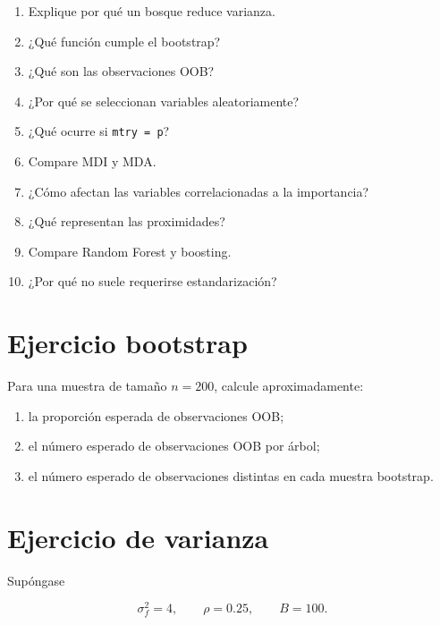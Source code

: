 \documentclass[
  spanish,
  10.5pt,
  letterpaper,
  DIV=11,
  numbers=noendperiod,
  oneside,
  open=any]{scrreprt}
\providecommand{\tightlist}{%
  \setlength{\itemsep}{0pt}\setlength{\parskip}{0pt}}
\theoremstyle{definition}
\theoremstyle{definition}
\theoremstyle{plain}
\theoremstyle{remark}
\begin{document}

\begin{enumerate}
\def\labelenumi{\arabic{enumi}.}
\tightlist
\item
  Explique por qué un bosque reduce varianza.
\item
  ¿Qué función cumple el bootstrap?
\item
  ¿Qué son las observaciones OOB?
\item
  ¿Por qué se seleccionan variables aleatoriamente?
\item
  ¿Qué ocurre si \texttt{mtry\ =\ p}?
\item
  Compare MDI y MDA.
\item
  ¿Cómo afectan las variables correlacionadas a la importancia?
\item
  ¿Qué representan las proximidades?
\item
  Compare Random Forest y boosting.
\item
  ¿Por qué no suele requerirse estandarización?
\end{enumerate}

\section*{Ejercicio bootstrap}\label{ejercicio-bootstrap-1}


Para una muestra de tamaño \(n=200\), calcule aproximadamente:

\begin{enumerate}
\def\labelenumi{\arabic{enumi}.}
\tightlist
\item
  la proporción esperada de observaciones OOB;
\item
  el número esperado de observaciones OOB por árbol;
\item
  el número esperado de observaciones distintas en cada muestra
  bootstrap.
\end{enumerate}

\section*{Ejercicio de varianza}\label{ejercicio-de-varianza}


Supóngase

\[
\sigma_f^2=4,
\qquad
\rho=0.25,
\qquad
B=100.
\]
\end{document}
